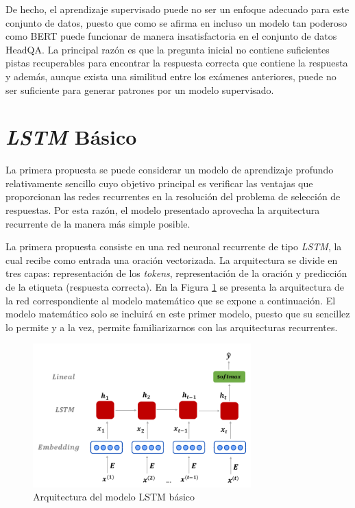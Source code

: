 De hecho, el aprendizaje supervisado puede no ser un enfoque adecuado para este conjunto de datos, puesto que como se afirma en \cite{2020-multi-step} incluso un modelo tan poderoso como BERT puede funcionar de manera insatisfactoria en el conjunto de datos HeadQA. La principal razón es que la pregunta inicial no contiene suficientes pistas recuperables para encontrar la respuesta correcta que contiene la respuesta y además, aunque exista una similitud entre los exámenes anteriores, puede no ser suficiente para generar patrones por un modelo supervisado.


\section{\textit{LSTM} Básico}\label{lstm_t}

La primera propuesta se puede considerar un modelo de aprendizaje profundo relativamente sencillo cuyo objetivo principal es verificar las ventajas que proporcionan las redes recurrentes en la resolución del problema de selección de respuestas. Por esta razón, el modelo presentado aprovecha la arquitectura recurrente de la manera más simple posible.

La primera propuesta consiste en una red neuronal recurrente de tipo \textit{LSTM}, la cual recibe como entrada una oración vectorizada. La arquitectura se divide en tres capas: representación de los \textit{tokens}, representación de la oración y predicción de la etiqueta (respuesta correcta). En la Figura \ref{lstm} se presenta la arquitectura de la red correspondiente al modelo matemático que se expone a continuación. El modelo matemático solo se incluirá en este primer modelo, puesto que su sencillez lo permite y a la vez, permite familiarizarnos con las arquitecturas recurrentes. 

\begin{figure}[!tb]
  \begin{center}    
    \includegraphics[angle=0, width=0.75\textwidth]{Graphics/lstm2.png} 
  \end{center}
    \caption{Arquitectura del modelo LSTM básico}\label{lstm}
\end{figure}

